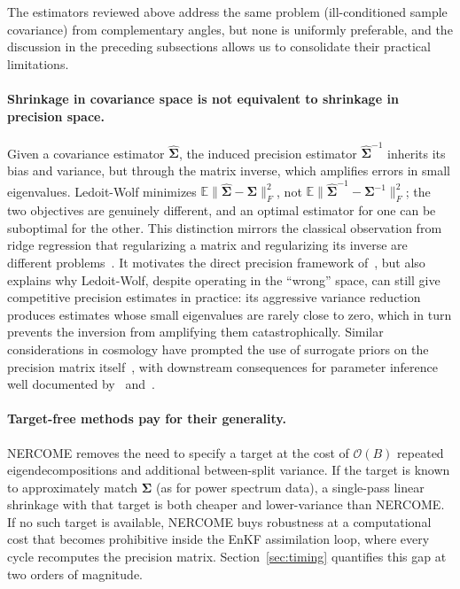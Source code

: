 The estimators reviewed above address the same problem (ill-conditioned sample covariance) from complementary angles, but none is uniformly preferable, and the discussion in the preceding subsections allows us to consolidate their practical limitations.

\paragraph{Shrinkage in covariance space is not equivalent to shrinkage in precision space.}
Given a covariance estimator $\hat{\boldsymbol{\Sigma}}$, the induced precision estimator $\hat{\boldsymbol{\Sigma}}^{-1}$ inherits its bias and variance, but through the matrix inverse, which amplifies errors in small eigenvalues. Ledoit-Wolf minimizes $\mathbb{E}\|\hat{\boldsymbol{\Sigma}} - \boldsymbol{\Sigma}\|_F^2$, not $\mathbb{E}\|\hat{\boldsymbol{\Sigma}}^{-1} - \boldsymbol{\Sigma}^{-1}\|_F^2$; the two objectives are genuinely different, and an optimal estimator for one can be suboptimal for the other. This distinction mirrors the classical observation from ridge regression that regularizing a matrix and regularizing its inverse are different problems~\citep{hoerl1970ridge,friedman1989regularized}. It motivates the direct precision framework of~\citet{bodnar2016direct}, but also explains why Ledoit-Wolf, despite operating in the ``wrong'' space, can still give competitive precision estimates in practice: its aggressive variance reduction produces estimates whose small eigenvalues are rarely close to zero, which in turn prevents the inversion from amplifying them catastrophically. Similar considerations in cosmology have prompted the use of surrogate priors on the precision matrix itself~\citep{paz2015improving,taylor2014estimating}, with downstream consequences for parameter inference well documented by~\citet{dodelson2013effect} and~\citet{sellentin2016parameter}.

\paragraph{Target-free methods pay for their generality.}
NERCOME removes the need to specify a target at the cost of $\mathcal{O}(B)$ repeated eigendecompositions and additional between-split variance. If the target is known to approximately match $\boldsymbol{\Sigma}$ (as for power spectrum data), a single-pass linear shrinkage with that target is both cheaper and lower-variance than NERCOME. If no such target is available, NERCOME buys robustness at a computational cost that becomes prohibitive inside the EnKF assimilation loop, where every cycle recomputes the precision matrix. Section~\ref{sec:timing} quantifies this gap at two orders of magnitude.

